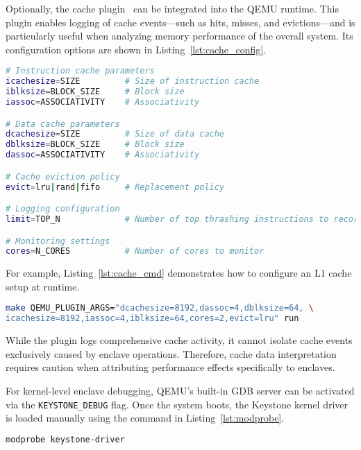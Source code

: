 Optionally, the cache plugin~\cite{mandour2021cache} can be integrated into the QEMU runtime. This plugin enables logging of cache events—such as hits, misses, and evictions—and is particularly useful when analyzing memory performance of the overall system. Its configuration options are shown in Listing~\ref{lst:cache_config}.
\begin{lstlisting}[language=bash,caption={Configuration options for cache simulation},label={lst:cache_config}]
# Instruction cache parameters
icachesize=SIZE         # Size of instruction cache
iblksize=BLOCK_SIZE     # Block size
iassoc=ASSOCIATIVITY    # Associativity

# Data cache parameters
dcachesize=SIZE         # Size of data cache
dblksize=BLOCK_SIZE     # Block size
dassoc=ASSOCIATIVITY    # Associativity

# Cache eviction policy
evict=lru|rand|fifo     # Replacement policy

# Logging configuration
limit=TOP_N             # Number of top thrashing instructions to record

# Monitoring settings
cores=N_CORES           # Number of cores to monitor
\end{lstlisting}


For example, Listing~\ref{lst:cache_cmd} demonstrates how to configure an L1 cache setup at runtime.

\begin{lstlisting}[language=bash, caption={Configuration command for cache plugin}, label={lst:cache_cmd}]
make QEMU_PLUGIN_ARGS="dcachesize=8192,dassoc=4,dblksize=64, \
icachesize=8192,iassoc=4,iblksize=64,cores=2,evict=lru" run
\end{lstlisting}

While the plugin logs comprehensive cache activity, it cannot isolate cache events exclusively caused by enclave operations. Therefore, cache data interpretation requires caution when attributing performance effects specifically to enclaves.

For kernel-level enclave debugging, QEMU’s built-in GDB server can be activated via the \texttt{KEYSTONE\_DEBUG} flag. Once the system boots, the Keystone kernel driver is loaded manually using the command in Listing~\ref{lst:modprobe}.

\begin{lstlisting}[language=bash, caption={Loading the Keystone kernel driver}, label={lst:modprobe}]
modprobe keystone-driver
\end{lstlisting}

